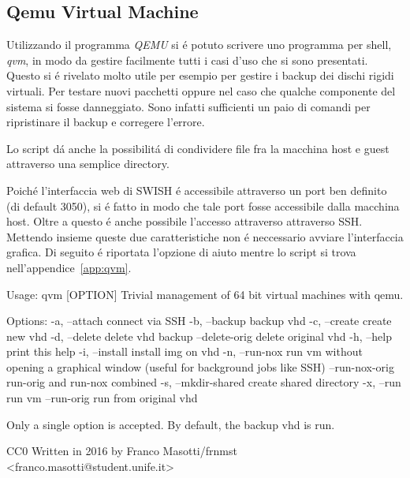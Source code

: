 \documentclass[10pt,titlepage,twoside,a4paper]{report}
\newenvironment{code}{\singlespacing\captionsetup{type=listing}}{}
\begin{document}
\subsection{Qemu Virtual Machine}
Utilizzando il programma \emph{QEMU}\cite{qemu} si \'e potuto scrivere uno 
programma per 
shell, \emph{qvm}, in modo da gestire facilmente tutti i casi d'uso che si 
sono presentati\cite{qvm}. Questo si \'e rivelato molto utile per esempio per 
gestire i backup  dei dischi rigidi virtuali. Per testare nuovi 
pacchetti oppure nel caso che qualche componente del sistema si fosse 
danneggiato. Sono infatti sufficienti un paio di comandi per ripristinare il 
backup e corregere l'errore.

Lo script d\'a anche la possibilit\'a di condividere file fra la macchina host 
e guest attraverso una semplice directory.

Poich\'e l'interfaccia web di SWISH \'e accessibile attraverso un port ben 
definito (di default 3050), si \'e fatto in modo che tale port fosse 
accessibile dalla macchina host. Oltre a questo \'e anche possibile l'accesso 
attraverso attraverso SSH. Mettendo insieme queste due caratteristiche non \'e 
neccessario avviare l'interfaccia grafica. Di seguito \'e riportata l'opzione 
di aiuto mentre lo script si trova nell'appendice~\ref{app:qvm}.

\begin{code}
    \caption{Pagina di aiuto di qvm}
    \begin{textcode*}{}
Usage: qvm [OPTION]
Trivial management of 64 bit virtual machines with qemu.

Options:
    -a, --attach                connect via SSH
    -b, --backup                backup vhd
    -c, --create                create new vhd
    -d, --delete                delete vhd backup
        --delete-orig           delete original vhd
    -h, --help                  print this help
    -i, --install               install img on vhd
    -n, --run-nox               run vm without opening a graphical window
                                (useful for background jobs like SSH)
        --run-nox-orig          run-orig and run-nox combined
    -s, --mkdir-shared          create shared directory
    -x, --run                   run vm
        --run-orig              run from original vhd


Only a single option is accepted.
By default, the backup vhd is run.

CC0
Written in 2016 by Franco Masotti/frnmst <franco.masotti@student.unife.it>
    \end{textcode*}
\end{code}
\end{document}
